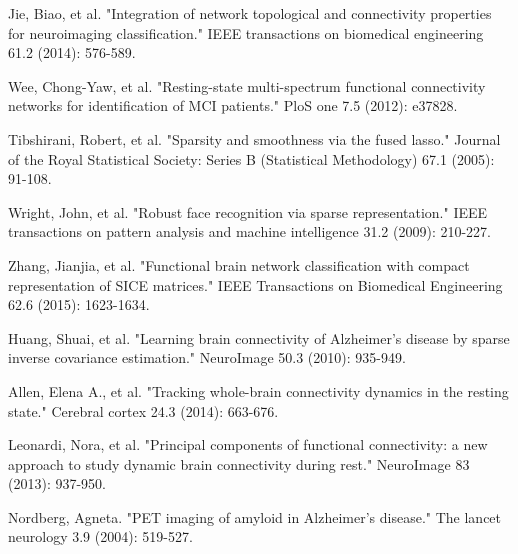 \documentclass[preprint,12pt]{elsarticle}
\begin{document}
\begin{thebibliography}{1}
		Jie, Biao, et al. "Integration of network topological and connectivity properties for neuroimaging classification." IEEE transactions on biomedical engineering 61.2 (2014): 576-589.
		
		Wee, Chong-Yaw, et al. "Resting-state multi-spectrum functional connectivity networks for identification of MCI patients." PloS one 7.5 (2012): e37828.
		
		Tibshirani, Robert, et al. "Sparsity and smoothness via the fused lasso." Journal of the Royal Statistical Society: Series B (Statistical Methodology) 67.1 (2005): 91-108.
		
		Wright, John, et al. "Robust face recognition via sparse representation." IEEE transactions on pattern analysis and machine intelligence 31.2 (2009): 210-227.
		
		Zhang, Jianjia, et al. "Functional brain network classification with compact representation of SICE matrices." IEEE Transactions on Biomedical Engineering 62.6 (2015): 1623-1634.
		
		Huang, Shuai, et al. "Learning brain connectivity of Alzheimer's disease by sparse inverse covariance estimation." NeuroImage 50.3 (2010): 935-949.
		
		Allen, Elena A., et al. "Tracking whole-brain connectivity dynamics in the resting state." Cerebral cortex 24.3 (2014): 663-676.
		
		
		
		Leonardi, Nora, et al. "Principal components of functional connectivity: a new approach to study dynamic brain connectivity during rest." NeuroImage 83 (2013): 937-950.
		
		
		Nordberg, Agneta. "PET imaging of amyloid in Alzheimer's disease." The lancet neurology 3.9 (2004): 519-527.
		

\end{thebibliography}
\end{document}
